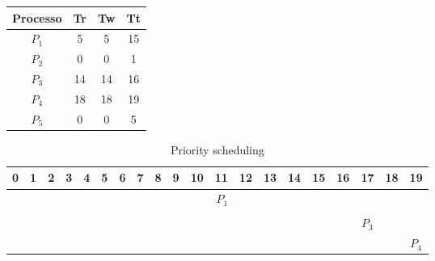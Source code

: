 \documentclass[a4paper]{article}
\begin{document}
\begin{table}[htb]
    \centering
    \label{my-label}
    \begin{tabular}{|c|c|c|c|}
        \hline
        Processo & Tr & Tw & Tt \\ \hline
        $P_1$    & 5  & 5  & 15 \\ \hline
        $P_2$    & 0  & 0  & 1  \\ \hline
        $P_3$    & 14 & 14 & 16 \\ \hline
        $P_4$    & 18 & 18 & 19 \\ \hline
        $P_5$    & 0  & 0  & 5  \\ \hline
    \end{tabular}
\end{table}

\begin{table}[htb]
    \centering
    \caption{Priority scheduling}
    \label{my-label}
    \begin{tabular}{|c|ccccc|cccccccccc|ccc|c|}
        \hline
        0                                                    & 1                                                  & 2                                                   & 3                                                  & 4                             & 5 & 6 & 7 & 8 & 9 & 10 & 11 & 12 & 13 & 14 & 15 & 16 & 17 & 18 & 19 \\ \hline
                                                             & \multicolumn{5}{c|}{}                              & \multicolumn{10}{c|}{\cellcolor[HTML]{656565}$P_1$} & \multicolumn{3}{c|}{}                              &                                                                                                     \\ \hline
        \cellcolor[HTML]{656565}{\color[HTML]{000000} $P_2$} & \multicolumn{5}{c|}{}                              & \multicolumn{10}{c|}{}                              & \multicolumn{3}{c|}{}                              &                                                                                                     \\ \hline
                                                             & \multicolumn{5}{c|}{}                              & \multicolumn{10}{c|}{}                              & \multicolumn{3}{c|}{\cellcolor[HTML]{656565}$P_3$} &                                                                                                     \\ \hline
                                                             & \multicolumn{5}{c|}{}                              & \multicolumn{10}{c|}{}                              & \multicolumn{3}{c|}{}                              & \cellcolor[HTML]{656565}$P_4$                                                                       \\ \hline

\end{tabular}
\end{table}
\end{document}
